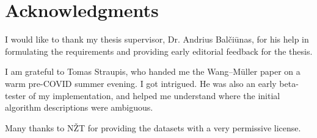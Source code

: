 \documentclass[a4paper]{article}
\newcommand{\WM}{Wang--M{\"u}ller}
\begin{document}
\section{Acknowledgments}
\label{sec:acknowledgments}

I would like to thank my thesis supervisor, Dr. Andrius Balčiūnas, for his help
in formulating the requirements and providing early editorial feedback for the
thesis.

I am grateful to Tomas Straupis, who handed me the {\WM}\cite{wang1998line}
paper on a warm pre-COVID summer evening. I got intrigued. He was also an early
beta-tester of my implementation, and helped me understand where the initial
algorithm descriptions were ambiguous.

Many thanks to NŽT for providing the datasets with a very permissive license.

\printbibliography
\end{document}
